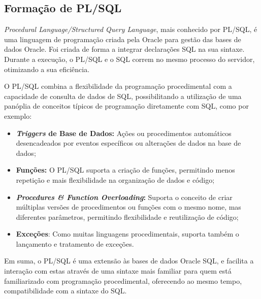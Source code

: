 
    \subsection{Formação de PL/SQL}\label{subsec:pl-sql}

      \textit{Procedural Language/Structured Query Language}, mais conhecido por PL/SQL, é uma linguagem de programação criada pela Oracle para gestão das bases de dados Oracle. Foi criada de forma a integrar declarações SQL na sua sintaxe. Durante a execução, o PL/SQL e o SQL correm no mesmo processo do servidor, otimizando a sua eficiência\cite{what-is-pl/sql}.

      O PL/SQL combina a flexibilidade da programação procedimental com a capacidade de consulta de dados de SQL, possibilitando a utilização de uma panóplia de conceitos típicos de programação diretamente com SQL, como por exemplo:
      \begin{itemize}
          \item \textbf{\textit{Triggers} de Base de Dados:} Ações ou procedimentos automáticos desencadeados por eventos específicos ou alterações de dados na base de dados;
          
          \item \textbf{Funções:} O PL/SQL suporta a criação de funções, permitindo menos repetição e mais flexibilidade na organização de dados e código;
          
          \item \textbf{\textit{Procedures \& Function Overloading}:} Suporta o conceito de criar múltiplas versões de procedimentos ou funções com o mesmo nome, mas diferentes parâmetros, permitindo flexibilidade e reutilização de código;

          \item \textbf{Exceções}: Como muitas linguagens procedimentais, suporta também o lançamento e tratamento de exceções.
      \end{itemize}
      
      Em suma, o PL/SQL é uma extensão às bases de dados Oracle SQL, e facilita a interação com estas através de uma sintaxe mais familiar para quem está familiarizado com programação procedimental, oferecendo ao mesmo tempo, compatibilidade com a sintaxe do SQL\cite{sql-language-reference}.

